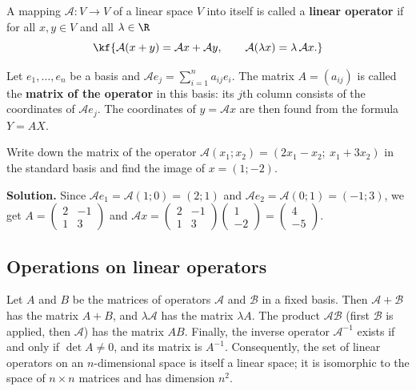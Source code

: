 
\begin{tarif}
A mapping $\mathcal A\colon V\to V$ of a linear space $V$ into itself is
called a \textbf{linear operator} if for all $x,y\in V$ and all $\lambda\in\R$
\[\kf{\mathcal A(x+y)=\mathcal Ax+\mathcal Ay,\qquad \mathcal A(\lambda x)=\lambda\,\mathcal Ax .}\]
\end{tarif}

\begin{tarif}
Let $e_1,\dots,e_n$ be a basis and $\mathcal Ae_j=\sum_{i=1}^na_{ij}e_i$. The matrix
$A=(a_{ij})$ is called the \textbf{matrix of the operator} in this basis:
its $j$th column consists of the coordinates of $\mathcal Ae_j$. The
coordinates of $y=\mathcal Ax$ are then found from the formula $Y=AX$.
\end{tarif}

\begin{misol}
Write down the matrix of the operator $\mathcal A(x_1;x_2)=(2x_1-x_2;\ x_1+3x_2)$
in the standard basis and find the image of $x=(1;-2)$.

\textbf{Solution.} Since $\mathcal Ae_1=\mathcal A(1;0)=(2;1)$ and
$\mathcal Ae_2=\mathcal A(0;1)=(-1;3)$, we get
$A=\begin{pmatrix}2&-1\\1&3\end{pmatrix}$ and
$\mathcal Ax=\begin{pmatrix}2&-1\\1&3\end{pmatrix}\begin{pmatrix}1\\-2\end{pmatrix}=\begin{pmatrix}4\\-5\end{pmatrix}$.
\end{misol}

\subsection{Operations on linear operators}

Let $A$ and $B$ be the matrices of operators $\mathcal A$ and $\mathcal B$ in a
fixed basis. Then $\mathcal A+\mathcal B$ has the matrix $A+B$, and $\lambda\mathcal A$
has the matrix $\lambda A$. The product $\mathcal A\mathcal B$ (first $\mathcal B$
is applied, then $\mathcal A$) has the matrix $AB$. Finally, the inverse operator
$\mathcal A^{-1}$ exists if and only if $\det A\neq0$, and its matrix is $A^{-1}$.
Consequently, the set of linear operators on an $n$-dimensional space is itself a
linear space; it is isomorphic to the space of $n\times n$ matrices and has dimension $n^2$.

